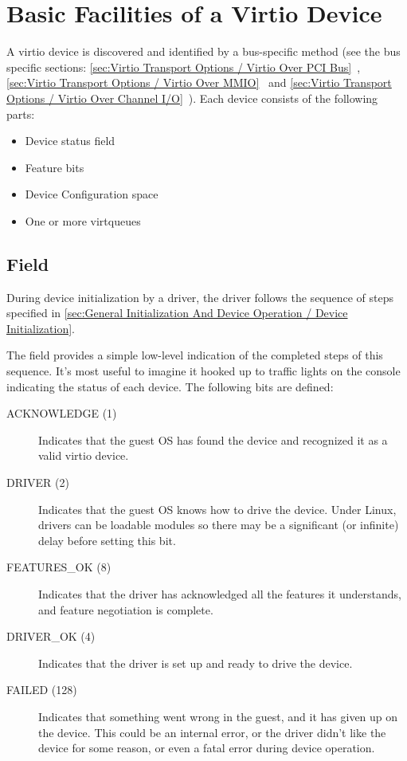 \chapter{Basic Facilities of a Virtio Device}\label{sec:Basic Facilities of a Virtio Device}

A virtio device is discovered and identified by a bus-specific method
(see the bus specific sections: \ref{sec:Virtio Transport Options / Virtio Over PCI Bus}~,
\ref{sec:Virtio Transport Options / Virtio Over MMIO}~ and \ref{sec:Virtio Transport Options / Virtio Over Channel I/O}~).  Each
device consists of the following parts:

\begin{itemize}
\item Device status field
\item Feature bits
\item Device Configuration space
\item One or more virtqueues
\end{itemize}

\section{ Field}\label{sec:Basic Facilities of a Virtio Device / Device Status Field}
During device initialization by a driver,
the driver follows the sequence of steps specified in
\ref{sec:General Initialization And Device Operation / Device
Initialization}.

The  field provides a simple low-level
indication of the completed steps of this sequence.
It's most useful to imagine it hooked up to traffic
lights on the console indicating the status of each device.  The
following bits are defined:
\begin{description}
\item[ACKNOWLEDGE (1)] Indicates that the guest OS has found the
  device and recognized it as a valid virtio device.

\item[DRIVER (2)] Indicates that the guest OS knows how to drive the
  device. Under Linux, drivers can be loadable modules so there
  may be a significant (or infinite) delay before setting this
  bit.

\item[FEATURES_OK (8)] Indicates that the driver has acknowledged all the
  features it understands, and feature negotiation is complete.

\item[DRIVER_OK (4)] Indicates that the driver is set up and ready to
  drive the device.

\item[FAILED (128)] Indicates that something went wrong in the guest,
  and it has given up on the device. This could be an internal
  error, or the driver didn't like the device for some reason, or
  even a fatal error during device operation.
\end{description}

